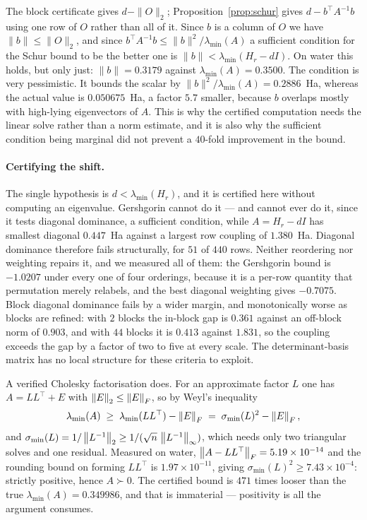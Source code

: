 \begin{remark}
\label{rem:schur-vs-block}
The block certificate gives $d-\|O\|_2$; Proposition~\ref{prop:schur} gives
$d-b^\top A^{-1}b$ using one row of $O$ rather than all of it. Since $b$ is a column
of $O$ we have $\|b\|\le\|O\|_2$, and since $b^\top A^{-1}b\le\|b\|^{2}/\lambda_{\min}(A)$
a sufficient condition for the Schur bound to be the better one is
$\|b\|<\lambda_{\min}(H_r-dI)$. On water this holds, but only just:
$\|b\|=0.3179$ against $\lambda_{\min}(A)=0.3500$.
The condition is very pessimistic. It bounds the scalar by
$\|b\|^{2}/\lambda_{\min}(A)=0.2886$~Ha, whereas the actual value is
$0.050675$~Ha, a factor $5.7$ smaller, because $b$ overlaps mostly with high-lying
eigenvectors of $A$. This is why the certified computation needs the linear solve
rather than a norm estimate, and it is also why the sufficient condition being
marginal did not prevent a $40$-fold improvement in the bound.
\end{remark}

\paragraph{Certifying the shift.}
The single hypothesis is $d < \lambda_{\min}(H_r)$, and it is certified here without
computing an eigenvalue. Gershgorin cannot do it --- and cannot ever do it, since it
tests diagonal dominance, a sufficient condition, while $A = H_r-dI$ has smallest
diagonal $0.447$~Ha against a largest row coupling of $1.380$~Ha. Diagonal dominance
therefore fails structurally, for $51$ of $440$ rows. Neither reordering nor
weighting repairs it, and we measured all of them: the Gershgorin bound is
$-1.0207$ under every one of four orderings, because it is a per-row quantity that
permutation merely relabels, and the best diagonal weighting gives $-0.7075$.
Block diagonal dominance fails by a wider margin, and monotonically worse as blocks
are refined: with $2$ blocks the in-block gap is $0.361$ against an off-block norm
of $0.903$, and with $44$ blocks it is $0.413$ against $1.831$, so the coupling
exceeds the gap by a factor of two to five at every scale. The determinant-basis
matrix has no local structure for these criteria to exploit.

A verified Cholesky factorisation does. For an approximate factor $L$ one has
$A = LL^\top + E$ with $\left\lVert E\right\rVert_2 \le \left\lVert E\right\rVert_F$, so by Weyl's inequality
\[
  \lambda_{\min}(A) \;\ge\; \lambda_{\min}(LL^\top) - \left\lVert E\right\rVert_F
  \;=\; \sigma_{\min}(L)^2 - \left\lVert E\right\rVert_F,
\]
and $\sigma_{\min}(L) = 1/\left\lVert L^{-1}\right\rVert_2 \ge 1/(\sqrt n\,\left\lVert L^{-1}\right\rVert_\infty)$,
which needs only two triangular solves and one residual. Measured on water,
$\left\lVert A-LL^\top\right\rVert_F = 5.19\times10^{-14}$ and the rounding bound on forming
$LL^\top$ is $1.97\times10^{-11}$, giving $\sigma_{\min}(L)^2 \ge 7.43\times10^{-4}$:
strictly positive, hence $A \succ 0$. The certified bound is $471$ times looser than
the true $\lambda_{\min}(A) = 0.349986$, and that is immaterial --- positivity is all
the argument consumes.

